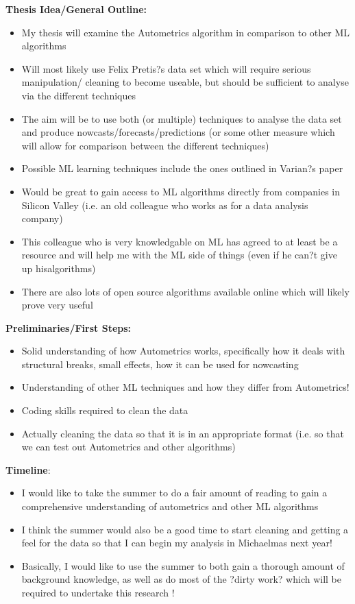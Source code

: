\documentclass[11pt, oneside]{book}   	%
\begin{document}
\textbf{Thesis Idea/General Outline:}
\begin{itemize}
\item My thesis will examine the Autometrics algorithm in comparison to other ML algorithms
\item Will most likely use Felix Pretis?s data set which will require serious manipulation/ cleaning to become useable, but should be sufficient to analyse via the different techniques
\item The aim will be to use both (or multiple) techniques to analyse the data set and produce nowcasts/forecasts/predictions (or some other measure which will allow for comparison between the different techniques)
\item Possible ML learning techniques include the ones outlined in Varian?s paper
\item Would be great to gain access to ML algorithms directly from companies in Silicon
Valley (i.e. an old colleague who works as for a data analysis company) 
\item This colleague who is very knowledgable on ML has agreed to at least be a
resource and will help me with the ML side of things (even if he can?t give up hisalgorithms)
\item There are also lots of open source algorithms available online which will likely prove
very useful 
\end{itemize}

\textbf{Preliminaries/First Steps:}
\begin{itemize}
\item Solid understanding of how Autometrics works, specifically how it deals with structural breaks, small effects, how it can be used for nowcasting
\item Understanding of other ML techniques and how they differ from Autometrics!
\item Coding skills required to clean the data
\item Actually cleaning the data so that it is in an appropriate format (i.e. so that we can
test out Autometrics and other algorithms) 
\end{itemize}

\textbf{Timeline}:
\begin{itemize}
\item I would like to take the summer to do a fair amount of reading to gain a comprehensive understanding of autometrics and other ML algorithms 
\item I think the summer would also be a good time to start cleaning and getting a feel for the data so that I can begin my analysis in Michaelmas next year!
\item Basically, I would like to use the summer to both gain a thorough amount of background knowledge, as well as do most of the ?dirty work? which will be required to undertake this research !
\end{itemize}
\end{document}
